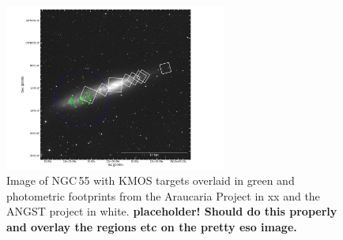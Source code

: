 \begin{figure}
 \centering
 \includegraphics[width=0.65\textwidth]{ngc55/ngc55_fields-v2}
 \caption[Image of NGC\,55 with KMOS and photometric footprints highlighted]{
          Image of NGC\,55 with KMOS targets overlaid in green and photometric footprints from the Araucaria Project
          \protect\citep{2005Msngr.121...23G} in xx
          and the ANGST project
          \protect\citep{2009ApJS..183...67D} in white.
          \textbf{placeholder! Should do this properly and overlay the regions etc on the pretty eso image.}
         }
 \label{fig:ngc55}
\end{figure}

